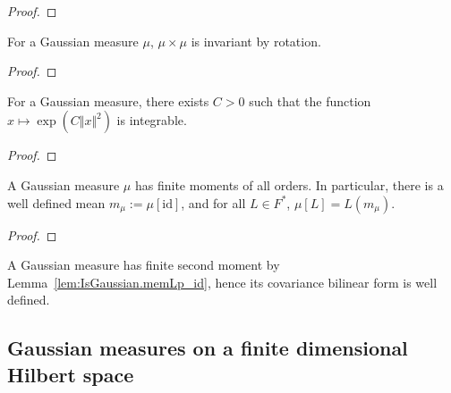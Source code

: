 \begin{proof}\leanok

\end{proof}


\begin{lemma}\label{lem:IsGaussian.map_rotation_eq_self}
  \leanok
For a Gaussian measure $\mu$, $\mu \times \mu$ is invariant by rotation.
\end{lemma}

\begin{proof}\leanok

\end{proof}


\begin{theorem}\label{thm:IsGaussian.exists_integrable_exp_sq}
  \leanok
For a Gaussian measure, there exists $C > 0$ such that the function $x \mapsto \exp (C \Vert x \Vert ^ 2)$ is integrable.
\end{theorem}

\begin{proof}\leanok

\end{proof}


\begin{lemma}\label{lem:IsGaussian.memLp_id}
  \leanok
A Gaussian measure $\mu$ has finite moments of all orders.
In particular, there is a well defined mean $m_\mu := \mu[\mathrm{id}]$, and for all $L \in F^*$, $\mu[L] = L(m_\mu)$.
\end{lemma}

\begin{proof}\leanok

\end{proof}

A Gaussian measure has finite second moment by Lemma~\ref{lem:IsGaussian.memLp_id}, hence its covariance bilinear form is well defined.


\subsection{Gaussian measures on a finite dimensional Hilbert space}

